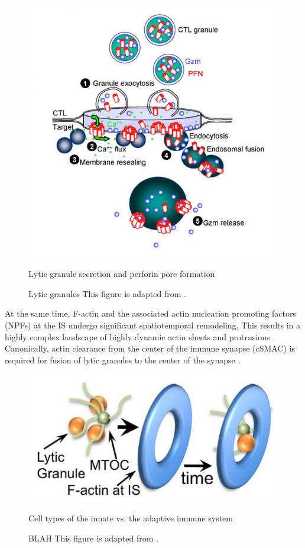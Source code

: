 \begin{figure}[htbp]
	\centering
	\includegraphics[width=\textwidth]{../figures/chapter1/degranulation.png}
	\caption{Lytic granule secretion and perforin pore formation}
	\caption*{Lytic granules This figure is adapted from \cite{Keefe2005_2}.}
	\label{fig:degranulation}
\end{figure}

At the same time,  F-actin and the associated actin nucleation promoting factors (NPFs) at the IS undergo significant spatiotemporal remodeling.  This results in a highly complex landscape of highly dynamic actin sheets and protrusions \cite{Ritter2015}. Canonically, actin clearance from the center of the immune synapse (cSMAC) is required for fusion of lytic granules to the center of the synapse \cite{Ritter2015}.

\begin{figure}[htbp]
	\centering
	\includegraphics[width=\textwidth]{../figures/chapter1/actinclearance.png}
	\caption{Cell types of the innate vs. the adaptive immune system}
	\caption*{BLAH This figure is adapted from \cite{Rak2011}.}
	\label{fig:actinclearance}
\end{figure}

